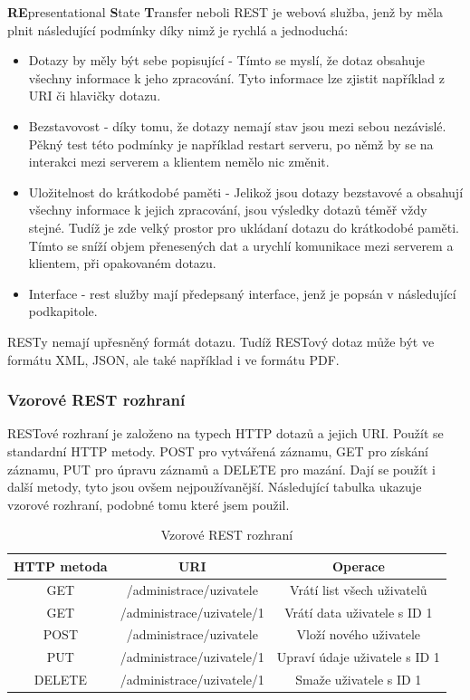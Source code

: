 \documentclass[czech,master,public,dept460,male,cpdeclaration,twoside]{diploma}
\begin{document}
{\bf RE}presentational {\bf S}tate {\bf T}ransfer neboli REST je webová služba, jenž by měla plnit následující podmínky díky nimž je rychlá a jednoduchá: 
\begin{itemize}
	\item Dotazy by měly být sebe popisující - Tímto se myslí, že dotaz obsahuje všechny informace k jeho zpracování. Tyto informace lze zjistit například z URI či hlavičky dotazu.
	\item Bezstavovost - díky tomu, že dotazy nemají stav jsou mezi sebou nezávislé. Pěkný test této podmínky je například restart serveru, po němž by se na interakci mezi serverem a klientem nemělo nic změnit.
	\item Uložitelnost do krátkodobé paměti - Jelikož jsou dotazy bezstavové a obsahují všechny informace k jejich zpracování, jsou výsledky dotazů téměř vždy stejné. Tudíž je zde velký prostor pro ukládaní dotazu do krátkodobé paměti. Tímto se sníží objem přenesených dat a urychlí komunikace mezi serverem a klientem, při opakovaném dotazu. 
	\item Interface - rest služby mají předepsaný interface, jenž je popsán v následující podkapitole.
\end{itemize}
RESTy nemají upřesněný formát dotazu. Tudíž RESTový dotaz může být ve formátu XML, JSON, ale také například i ve formátu PDF. \cite{RESTWebServicesOracle} \cite{RESTWebServicesOracle2}

\subsubsection{Vzorové REST rozhraní}
RESTové rozhraní je založeno na typech HTTP dotazů a jejich URI. Použít se standardní HTTP metody. POST pro vytvářená záznamu, GET pro získání záznamu, PUT pro úpravu záznamů a DELETE pro mazání. Dají se použít i další metody, tyto jsou ovšem nejpoužívanější. Následující tabulka ukazuje vzorové rozhraní, podobné tomu které jsem použil. \cite{RESTInterface}

\begin{table}[H]
	\centering
	\caption{Vzorové REST rozhraní}
	\label{tab:REST}
	\begin{tabular}{|c|c|c|}
		\hline
		{\bf HTTP metoda} & {\bf URI} & {\bf Operace} \\
		\hline
		GET & /administrace/uzivatele & Vrátí list všech uživatelů \\
		\hline
		GET & /administrace/uzivatele/1 & Vrátí data uživatele s ID 1 \\
		\hline
		POST & /administrace/uzivatele & Vloží nového uživatele \\
		\hline
		PUT & /administrace/uzivatele/1 & Upraví údaje uživatele s ID 1 \\
		\hline
		DELETE & /administrace/uzivatele/1 & Smaže uživatele s ID 1 \\
		\hline
	\end{tabular}
\end{table}
	
\end{document}
